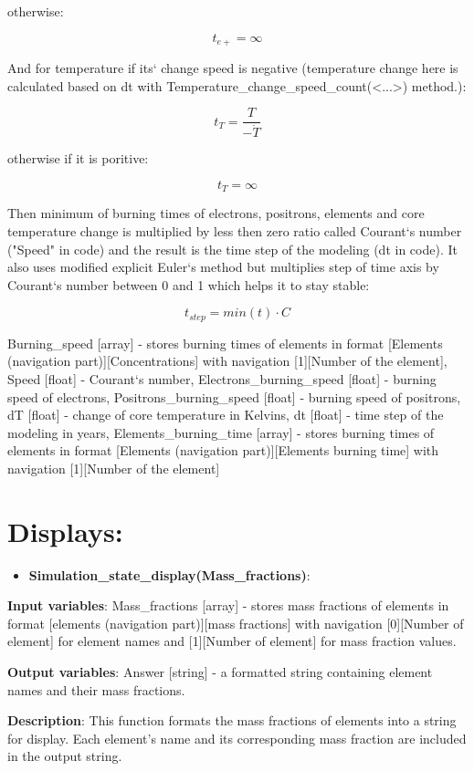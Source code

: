 \documentclass[a4paper,12pt]{article}
\newcommand{\namefunction}[4]{
  \begin{itemize}
    \item \textbf{#1}:
  \end{itemize}
  
  \textbf{Input variables}: #2.
  
  \textbf{Output variables}: #4.
  
  \textbf{Description}: #3.
}
\begin{document}
{otherwise:

\[t_{e+} = \infty\]

And for temperature if its` change speed is negative (temperature change here is calculated based on dt with Temperature\_change\_speed\_count(<...>) method.):

\[t_{T} = \frac{T}{-\dot{T}}\]

otherwise if it is poritive:

\[t_{T} = \infty\]

Then minimum of burning times of electrons, positrons, elements and core temperature change is multiplied by less then zero ratio called Courant`s number ("Speed" in code) and the result is the time step of the modeling (dt in code). It also uses modified explicit Euler`s method but multiplies step of time axis by Courant`s number between 0 and 1 which helps it to stay stable:

\[t_{step} = min(t) \cdot C\]

}{Burning\_speed [array] - stores burning times of elements in format [Elements (navigation part)][Concentrations] with navigation [1][Number of the element], Speed [float] - Courant`s number, Electrons\_burning\_speed [float] - burning speed of electrons, Positrons\_burning\_speed [float] - burning speed of positrons, dT [float] - change of core temperature in Kelvins, dt [float] - time step of the modeling in years, Elements\_burning\_time [array] - stores burning times of elements in format [Elements (navigation part)][Elements burning time] with navigation [1][Number of the element]}

\section{Displays:}

\vspace{1em}

\namefunction{Simulation\_state\_display(Mass\_fractions)}{Mass\_fractions [array] - stores mass fractions of elements in format [elements (navigation part)][mass fractions] with navigation [0][Number of element] for element names and [1][Number of element] for mass fraction values}{This function formats the mass fractions of elements into a string for display. Each element's name and its corresponding mass fraction are included in the output string}{Answer [string] - a formatted string containing element names and their mass fractions}

\vspace{1em}
\end{document}

